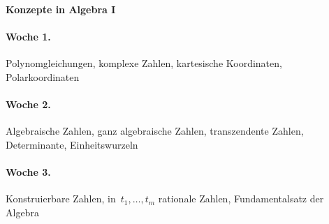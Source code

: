 \documentclass{../algblatt}
\begin{document}
\begin{center}\huge \textsf{\textbf{Konzepte in Algebra I}}\end{center}
\vspace{1em}


\paragraph{Woche 1.} Polynomgleichungen, komplexe Zahlen, kartesische
Koordinaten, Polarkoordinaten

\paragraph{Woche 2.} Algebraische Zahlen, ganz algebraische Zahlen,
transzendente Zahlen, Determinante, Einheitswurzeln

\paragraph{Woche 3.} Konstruierbare Zahlen, in~$t_1,\ldots,t_m$ rationale
Zahlen, Fundamentalsatz der Algebra

\end{document}

